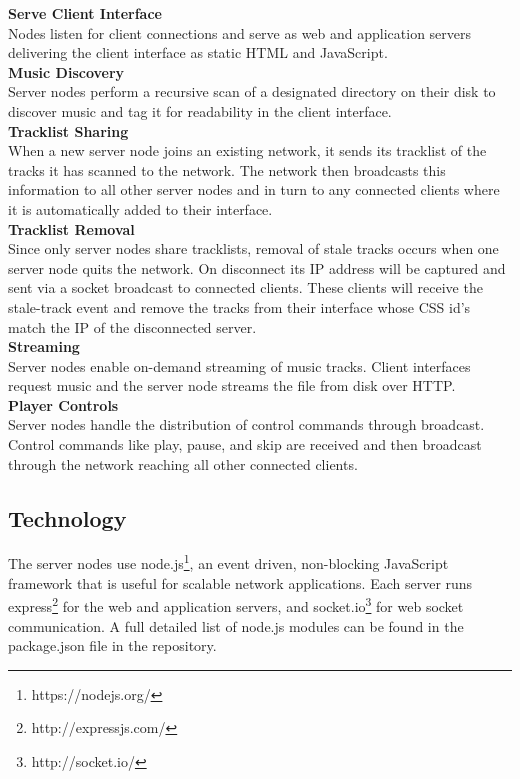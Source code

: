\documentclass[12pt]{article}
\begin{document}
\textbf{Serve Client Interface}\\
Nodes listen for client connections and serve as web and application servers delivering the client interface as static HTML and JavaScript.\\

\textbf{Music Discovery}\\
Server nodes perform a recursive scan of a designated directory on their disk to discover music and tag it for readability in the client interface.\\

\textbf{Tracklist Sharing}\\
When a new server node joins an existing network, it sends its tracklist of the tracks it has scanned to the network. The network then broadcasts this information to all other server nodes and in turn to any connected clients where it is automatically added to their interface.\\

\textbf{Tracklist Removal}\\
Since only server nodes share tracklists, removal of stale tracks occurs when one server node quits the network. On disconnect its IP address will be captured and sent via a socket broadcast to connected clients. These clients will receive the stale-track event and remove the tracks from their interface whose CSS id's match the IP of the disconnected server.\\

\textbf{Streaming}\\
Server nodes enable on-demand streaming of music tracks. Client interfaces request music and the server node streams the file from disk over HTTP.\\

\textbf{Player Controls}\\
Server nodes handle the distribution of control commands through broadcast. Control commands like play, pause, and skip are received and then broadcast through the network reaching all other connected clients.

\subsection{Technology}
The server nodes use node.js\footnote{https://nodejs.org/}, an event driven, non-blocking JavaScript framework that is useful for scalable network applications. Each server runs express\footnote{http://expressjs.com/} for the web and application servers, and socket.io\footnote{http://socket.io/} for web socket communication. A full detailed list of node.js modules can be found in the package.json file in the repository.
\end{document}
